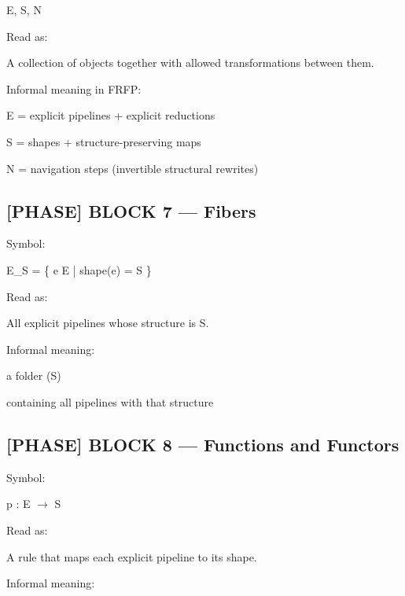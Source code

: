 E, S, N\par

Read as:\par

 A collection of objects together with allowed transformations between them. \par

Informal meaning in FRFP:\par

E = explicit pipelines + explicit reductions\par

S = shapes + structure-preserving maps\par

N = navigation steps (invertible structural rewrites)\par

\subsection*{[PHASE] BLOCK 7 --- Fibers}

Symbol:\par

E\_S = \{ e E | shape(e) = S \}\par

Read as:\par

 All explicit pipelines whose structure is S. \par

Informal meaning:\par

a folder (S)\par

containing all pipelines with that structure\par

\subsection*{[PHASE] BLOCK 8 --- Functions and Functors}

Symbol:\par

p : E $\to$ S\par

Read as:\par

 A rule that maps each explicit pipeline to its shape. \par

Informal meaning:\par


